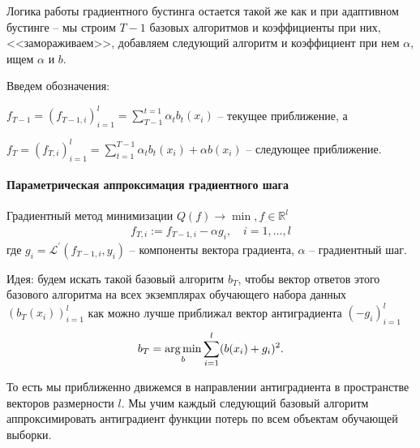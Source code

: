 \documentclass[%
	11pt,
	a4paper,
	utf8,
		]{article}
\begin{document}
Логика работы градиентного бустинга остается такой же как и при адаптивном бустинге -- мы строим $ T - 1 $ базовых алгоритмов и коэффициенты при них, <<замораживаем>>, добавляем следующий алгоритм и коэффициент при нем $ \alpha $, ищем $ \alpha $ и $ b $.

Введем обозначения:

$ f_{T - 1} = (f_{T - 1, i})_{i = 1}^l = \sum^{t=1}_{T - 1} \alpha_t b_t(x_i) $ -- текущее приближение, а

$ f_T = (f_{T, i})_{i = 1}^l = \sum_{t=1}^{T-1} \alpha_t b_t(x_i) + \alpha b(x_i) $ -- следующее приближение.

\paragraph{Параметрическая аппроксимация градиентного шага} Градиентный метод минимизации $ Q(f) \to \min, f \in \mathbb{R}^l $
\begin{align*}
	f_{T, i} := f_{T-1, i} - \alpha g_i, \quad i = 1, \ldots, l
\end{align*}
где $ g_i = \mathcal{L}^{'}(f_{T-1, i}, y_i) $ -- компоненты вектора градиента, $ \alpha $ -- градиентный шаг.

Идея: будем искать такой базовый алгоритм $ b_T $, чтобы вектор ответов этого базового алгоритма на всех экземплярах обучающего набора данных $ (b_T(x_i))_{i = 1}^l $ как можно лучше приближал вектор антиградиента $ (-g_i)_{i = 1}^l $
\begin{align*}
	b_T = \underset{b}{\operatorname*{arg\,min}} \sum_{i=1}^{l} (b(x_i) + g_i)^2.
\end{align*}

То есть мы приближенно движемся в направлении антиградиента в пространстве векторов размерности $ l $. Мы учим каждый следующий базовый алгоритм аппроксимировать антиградиент функции потерь по всем объектам обучающей выборки.
\end{document}
